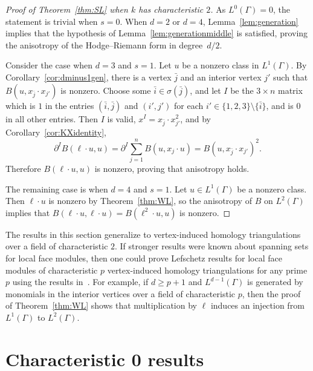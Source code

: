\begin{proof}[Proof of Theorem~\ref{thm:SL} when $k$ has characteristic $2$]
As $L^0(\Gamma) = 0$, the statement is trivial when $s=0$. 
When $d = 2$ or $d=4$, Lemma~\ref{lem:generation} implies that the hypothesis of Lemma~\ref{lem:generationmiddle} is satisfied, proving the anisotropy of the Hodge--Riemann form in degree~$d/2$. 

Consider the case when $d=3$ and $s=1$. Let $u$ be a nonzero class in $L^1(\Gamma)$. By Corollary~\ref{cor:dminus1gen}, there is a vertex $\bar{j}$ and an interior vertex $j'$ such that $B(u,  x_{\bar{j}} \cdot x_{j'} )$ is nonzero. Choose some $\bar{i} \in \sigma(\bar{j})$, and let $I$ be the $3 \times n$ matrix which is $1$ in the entries $(\bar{i}, \bar{j})$ and $(i', j')$ for each $i' \in \{1, 2, 3\} \setminus \{\bar{i}\}$, and is $0$ in all other entries. Then $I$ is valid, $x^I = x_{\bar{j}} \cdot x_{j'}^2$, and by Corollary~\ref{cor:KXidentity},
$$\partial^I B(\ell \cdot u, u) = \partial^I \sum_{j=1}^{n} B(u, x_j \cdot u) = B(u, x_{\bar{j}} \cdot x_{j'})^2.$$
Therefore $B(\ell \cdot u, u)$ is nonzero, proving that anisotropy holds. 

The remaining case is when $d=4$ and $s=1$. Let $u \in L^1(\Gamma)$ be a nonzero class. Then $\ell \cdot u$ is nonzero by Theorem~\ref{thm:WL}, so the anisotropy of $B$ on $L^2(\Gamma)$ implies that $B(\ell \cdot u, \ell \cdot u) = B(\ell^2 \cdot u, u)$ is nonzero. 
\end{proof}

\begin{rema}\label{rem:homologylefschetz}
The results in this section generalize to vertex-induced homology triangulations over a field of characteristic $2$. If stronger results were known about spanning sets for local face modules, then one could prove Lefschetz results for local face modules of characteristic $p$ vertex-induced homology triangulations for any prime $p$ using the results in~\cite{KLS}. For example, if $d \ge p+1$ and $L^{d-1}(\Gamma)$ is generated by monomials in the interior vertices over a field of characteristic $p$, then the proof of Theorem~\ref{thm:WL} shows that multiplication by $\ell$ induces an injection from $L^1(\Gamma)$ to $L^2(\Gamma)$. 
\end{rema}

\section{Characteristic 0 results}\label{sec:char0}

